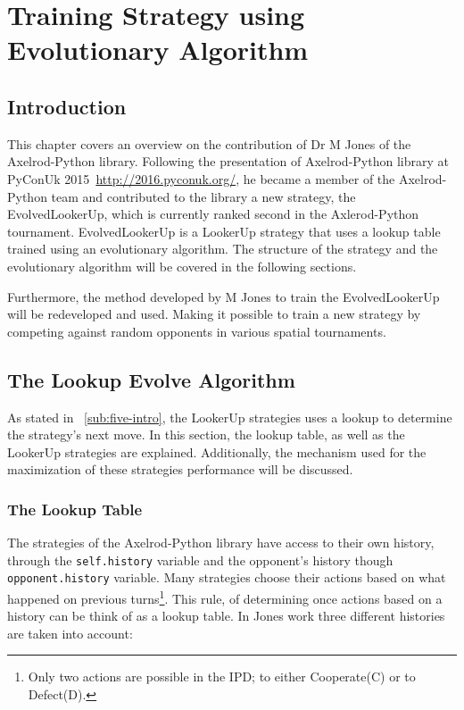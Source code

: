 \chapter{Training Strategy using Evolutionary Algorithm}
\section{Introduction}
\label{sub:five-intro}
This chapter covers an overview on the contribution of Dr M Jones
of the Axelrod-Python library. Following the presentation of Axelrod-Python
library at PyConUk 2015~\url{http://2016.pyconuk.org/}, he became a member of
the Axelrod-Python team and contributed to the library a new strategy, the
EvolvedLookerUp, which is currently ranked second in the Axlerod-Python tournament.
EvolvedLookerUp is a LookerUp strategy that uses a lookup table trained using an
evolutionary algorithm. The structure of the strategy and the evolutionary algorithm
will be covered in the following sections.

Furthermore, the method developed by M Jones to train the EvolvedLookerUp
will be redeveloped and used. Making it possible to train a new strategy
by competing against random opponents in various spatial tournaments.


\section{The Lookup Evolve Algorithm}
\label{sub:lookup-evolve-algorithm}
As stated in ~\autoref{sub:five-intro}, the LookerUp strategies uses a lookup to
determine the strategy's next move. In this section, the lookup table, as well as
the LookerUp strategies are explained. Additionally, the mechanism used for the
maximization of these strategies performance will be discussed.

\subsection{The Lookup Table}
The strategies of the Axelrod-Python library have access to their own history,
through the \texttt{self.history} variable and the opponent's history though
\texttt{opponent.history} variable. Many strategies choose their actions based
on what happened on previous turns\footnote{Only two actions are possible in the
IPD; to either Cooperate(C) or to Defect(D).}. This rule, of determining once actions
based on a history can be think of as a lookup table.
In Jones work three different histories are taken into account:

